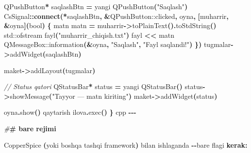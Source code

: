 \documentclass[a4paper,11pt,twoside,openright]{book}
\newenvironment{Shaded}{\begin{snugshade}}{\end{snugshade}}
\newcommand{\BuiltInTok}[1]{#1}
\newcommand{\CharTok}[1]{\textcolor[rgb]{0.31,0.60,0.02}{#1}}
\newcommand{\CommentTok}[1]{\textcolor[rgb]{0.56,0.35,0.01}{\textit{#1}}}
\newcommand{\DataTypeTok}[1]{\textcolor[rgb]{0.13,0.29,0.53}{#1}}
\newcommand{\ErrorTok}[1]{\textcolor[rgb]{0.64,0.00,0.00}{\textbf{#1}}}
\newcommand{\ExtensionTok}[1]{#1}
\newcommand{\FunctionTok}[1]{\textcolor[rgb]{0.13,0.29,0.53}{\textbf{#1}}}
\newcommand{\NormalTok}[1]{#1}
\newcommand{\OperatorTok}[1]{\textcolor[rgb]{0.81,0.36,0.00}{\textbf{#1}}}
\newcommand{\PreprocessorTok}[1]{\textcolor[rgb]{0.56,0.35,0.01}{\textit{#1}}}
\newcommand{\StringTok}[1]{\textcolor[rgb]{0.31,0.60,0.02}{#1}}
\begin{document}
\begin{Shaded}
\begin{Highlighting}[]
    \ExtensionTok{QPushButton}\OperatorTok{*}\NormalTok{ saqlashBtn }\OperatorTok{=}\NormalTok{ yangi }\ExtensionTok{QPushButton}\OperatorTok{(}\StringTok{"Saqlash"}\OperatorTok{)}
\NormalTok{    CsSignal}\OperatorTok{::}\FunctionTok{connect}\OperatorTok{(*}\NormalTok{saqlashBtn}\OperatorTok{,} \OperatorTok{\&}\ExtensionTok{QPushButton::clicked}\OperatorTok{,}\NormalTok{ oyna}\OperatorTok{,} \OperatorTok{[}\NormalTok{muharrir}\OperatorTok{,} \OperatorTok{\&}\NormalTok{oyna}\OperatorTok{](}\DataTypeTok{bool}\OperatorTok{)} \OperatorTok{\{}
\NormalTok{        matn matn }\OperatorTok{=}\NormalTok{ muharrir}\OperatorTok{{-}\textgreater{}}\NormalTok{toPlainText}\OperatorTok{().}\NormalTok{toStdString}\OperatorTok{()}
        \BuiltInTok{std::}\NormalTok{ofstream fayl}\OperatorTok{(}\StringTok{"muharrir\_chiqish.txt"}\OperatorTok{)}
\NormalTok{        fayl }\OperatorTok{\textless{}\textless{}}\NormalTok{ matn}
        \ExtensionTok{QMessageBox::information}\OperatorTok{(\&}\NormalTok{oyna}\OperatorTok{,} \StringTok{"Saqlash"}\OperatorTok{,} \StringTok{"Fayl saqlandi!"}\OperatorTok{)}
    \OperatorTok{\})}
\NormalTok{    tugmalar}\OperatorTok{{-}\textgreater{}}\NormalTok{addWidget}\OperatorTok{(}\NormalTok{saqlashBtn}\OperatorTok{)}

\NormalTok{    maket}\OperatorTok{{-}\textgreater{}}\NormalTok{addLayout}\OperatorTok{(}\NormalTok{tugmalar}\OperatorTok{)}

    \CommentTok{// Status qatori}
    \ExtensionTok{QStatusBar}\OperatorTok{*}\NormalTok{ status }\OperatorTok{=}\NormalTok{ yangi }\ExtensionTok{QStatusBar}\OperatorTok{()}
\NormalTok{    status}\OperatorTok{{-}\textgreater{}}\NormalTok{showMessage}\OperatorTok{(}\StringTok{"Tayyor — matn kiriting"}\OperatorTok{)}
\NormalTok{    maket}\OperatorTok{{-}\textgreater{}}\NormalTok{addWidget}\OperatorTok{(}\NormalTok{status}\OperatorTok{)}

\NormalTok{    oyna}\OperatorTok{.}\NormalTok{show}\OperatorTok{()}
\NormalTok{    qaytarish ilova}\OperatorTok{.}\NormalTok{exec}\OperatorTok{()}
\OperatorTok{\}}
\ErrorTok{\textasciigrave{}\textasciigrave{}\textasciigrave{}}\NormalTok{cpp}
\OperatorTok{{-}{-}{-}}

\PreprocessorTok{\#}\ErrorTok{\# \textasciigrave{}{-}{-}bare\textasciigrave{} rejimi}

\NormalTok{CopperSpice }\OperatorTok{(}\NormalTok{yoki boshqa tashqi framework}\OperatorTok{)}\NormalTok{ bilan ishlaganda }\ErrorTok{\textasciigrave{}}\OperatorTok{{-}{-}}\NormalTok{bare}\ErrorTok{\textasciigrave{}}\NormalTok{ flag}\CharTok{\textquotesingle{}i}\ErrorTok{ kerak:}


\end{Highlighting}
\end{Shaded}
\end{document}

